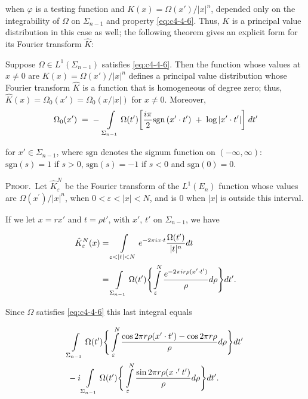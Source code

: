 when $\varphi$ is a testing function and $K(x) = \Omega(x')/|x|^n$, depended only on the integrability of $\Omega$ on $\Sigma_{n-1}$ and property \eqref{eq:c4-4-6}. Thus, $K$ is a principal value distribution in this case as well; the following theorem gives an explicit form for its Fourier transform $\hat{K}$:

\begin{theorem}
\label{thm:c4-4-11}
Suppose $\Omega \in L^{1}(\Sigma_{n-1})$ satisfies \eqref{eq:c4-4-6}. Then the function whose values at $x \neq 0$ are $K(x) = \Omega(x')/|x|^{n}$ defines a principal value distribution whose Fourier transform $\hat{K}$ is a function that is homogeneous of degree zero; thus, $\hat{K}(x) = \Omega_0(x') = \Omega_0(x/|x|)$ for $x \neq 0$. Moreover,
\[
\Omega_{0}(x^{\prime})\;=\;-\;\intop_{\Sigma_{n-1}}\Omega(t^{\prime})\biggl[\frac{i\pi}{2}\text{sgn}\left(x^{\prime}\cdot t^{\prime}\right)\;+\;\log\left|x^{\prime}\cdot t^{\prime}\right|\biggr]\;d t^{\prime}
\]

for $x' \in \Sigma_{n-1}$, where $\text{sgn}$ denotes the signum function on $(-\infty, \infty)$: $\text{sgn}(s) = 1$ if $s > 0$, $\text{sgn}(s) = -1$ if $s < 0$ and $\text{sgn}(0) = 0$.
\end{theorem}

\textsc{Proof.}\ Let $\hat{K}_{\varepsilon}^{N}$ be the Fourier transform of the $L^{1}(E_{n})$ function whose values are $\Omega(x^{\prime})/|x|^{n}$, when $0 < \varepsilon < |x| < N$, and is 0 when $|x|$ is outside this interval.

If we let $x = rx'$ and $t = \rho t'$, with $x'$, $t'$ on $\Sigma_{n-1}$, we have

\[
\begin{aligned}{\hat{K}_{\varepsilon}^{N}(x)}&{{}=\intop_{\varepsilon<|t|<N}e^{-2\pi i x\cdot t}\frac{\Omega(t^{\prime})}{|t|^{n}}d t}\\ {}&{{}=\intop_{\Sigma_{n-1}}\Omega(t^{\prime})\Biggl\{\intop_{\varepsilon}^{N}\frac{e^{-2\pi i r\rho(x^{\prime}\cdot t^{\prime})}}{\rho}d\rho\Biggr\}d t^{\prime}.}\\ \end{aligned}
\]

Since $\Omega$ satisfies \eqref{eq:c4-4-6} this last integral equals

\[
\begin{aligned}&{\intop_{\Sigma_{n-1}}\Omega(t^{\prime})\Bigg\{\intop_{\varepsilon}^{N}\frac{\cos2\pi r\rho(x^{\prime}\cdot t^{\prime})-\cos2\pi r\rho}{\rho}d\rho\Bigg\}d t^{\prime}}\\ {}&{{}-i\intop_{\Sigma_{n-1}}\Omega(t^{\prime})\Bigg\{\intop_{\varepsilon}^{N}\frac{\sin2\pi r\rho(x\cdot^{\prime}t^{\prime})}{\rho}d\rho\Bigg\}d t^{\prime}.}\\ \end{aligned}
\]

